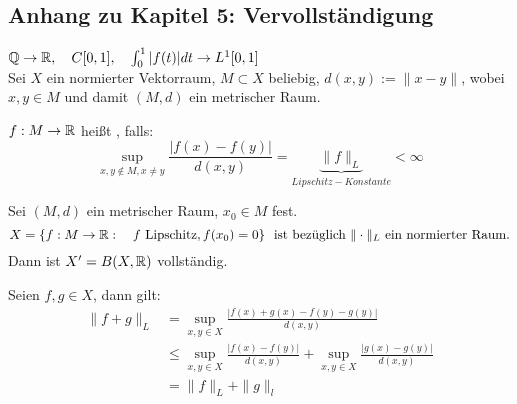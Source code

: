 \subsection{Anhang zu Kapitel 5: Vervollständigung}
$\mathbb{Q} \rightarrow \mathbb{R}, \quad C[0, 1], \quad \int_{0}^{1} |f(t)| dt \rightarrow L^{1}[0, 1]$ \\
Sei $X$ ein normierter Vektorraum, $M \subset X$ beliebig, $d(x, y) := \| x - y \|$, wobei $x, y \in M$ und damit $(M, d)$ ein metrischer Raum.

\begin{definition} \label{def:5.15-Lipschitz}
	$f: M \rightarrow \mathbb{R}$ hei{\ss}t , falls:
	\[ \sup_{x, y \notin M, x \neq y} \frac{|f(x) - f(y)|}{d(x, y)} = \underbrace{\| f \|_{L}}_{Lipschitz-Konstante} < \infty \]
\end{definition}

\begin{bemerkung}
	Sei $(M, d)$ ein metrischer Raum, $x_{0} \in M$ fest. \\
	\[ X = \{ f: M \rightarrow \MdR: \quad f \text{ Lipschitz}, f(x_{0}) = 0 \} \text{ ist bezüglich } \| \cdot \|_{L} \text{ ein normierter Raum.} \]	
	Dann ist $X' = B(X, \mathbb{R})$ vollständig.
	\begin{beweis}
		Seien $f, g \in X$, dann gilt:  
		\begin{align*}
			\| f + g \|_{L} & = \sup_{x, y \in X} \frac{|f(x) + g(x) - f(y) - g(y)|}{d(x, y)} \\
							& \leq \sup_{x, y \in X} \frac{|f(x) - f(y)|}{d(x, y)} + \sup_{x, y \in X} \frac{|g(x) - g(y)|}{d(x, y)} \\
							& = \| f \|_{L} + \| g \|_{l} 			
		\end{align*} 
	\end{beweis}
\end{bemerkung}

